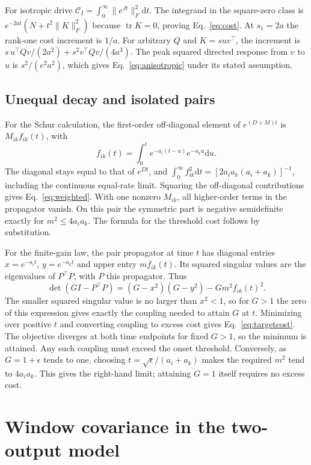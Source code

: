 \documentclass[aps,10pt,onecolumn,superscriptaddress,nofootinbib,longbibliography,
  amsmath,amssymb,floatfix]{revtex4-2}
\newcommand{\Tr}{\operatorname{tr}}
\newcommand{\Cnoise}{\mathcal C}
\newcommand{\dd}{\mathrm{d}}
\begin{document}
For isotropic drive \(\Cnoise_I=\int_0^\infty \|e^{Jt}\|_F^2\dd t\).
The integrand in the square-zero class is
\(e^{-2at}(N+t^2\|K\|_F^2)\) because \(\Tr K=0\), proving
Eq.~\eqref{eq:cost}. At \(s_1=2a\) the rank-one cost increment is
\(1/a\). For arbitrary \(Q\) and \(K=suv^\top\), the increment is
\(s\,u^\top Qv/(2a^2)+s^2 v^\top Qv/(4a^3)\).
The peak squared directed response from \(v\) to \(u\) is
\(s^2/(e^2a^2)\), which gives Eq.~\eqref{eq:anisotropic} under
its stated assumption.

\subsection{Unequal decay and isolated pairs}

For the Schur calculation, the first-order off-diagonal element of
\(e^{(D+M)t}\) is \(M_{ik}f_{ik}(t)\), with
\[
  f_{ik}(t)=\int_0^t e^{-a_i(t-u)}e^{-a_k u}\dd u .
\]
The diagonal stays equal to that of \(e^{Dt}\), and
\(\int_0^\infty f_{ik}^2\dd t=[2a_i a_k(a_i+a_k)]^{-1}\),
including the continuous equal-rate limit. Squaring the
off-diagonal contributions gives Eq.~\eqref{eq:weighted}.
With one nonzero \(M_{ik}\), all higher-order terms in the propagator
vanish. On this pair the symmetric part is negative semidefinite
exactly for \(m^2\le4a_i a_k\). The formula for the threshold cost
follows by substitution.

For the finite-gain law, the pair propagator at time \(t\) has
diagonal entries \(x=e^{-a_i t}\), \(y=e^{-a_k t}\) and upper
entry \(m f_{ik}(t)\). Its squared singular values are the
eigenvalues of \(P^\top P\), with \(P\) this propagator. Thus
\[
 \det(GI-P^\top P)=(G-x^2)(G-y^2)-Gm^2 f_{ik}(t)^2 .
\]
The smaller squared singular value is no larger than \(x^2<1\),
so for \(G>1\) the zero of this expression gives exactly the
coupling needed to attain \(G\) at \(t\). Minimizing over
positive \(t\) and converting coupling to excess cost gives
Eq.~\eqref{eq:targetcost}. The objective diverges at both time
endpoints for fixed \(G>1\), so the minimum is attained.
Any such coupling must exceed the onset threshold. Conversely,
as \(G=1+\epsilon\) tends to one, choosing
\(t=\sqrt{\epsilon}/(a_i+a_k)\) makes the required \(m^2\) tend to
\(4a_i a_k\). This gives the right-hand limit; attaining \(G=1\)
itself requires no excess cost.

\section{Window covariance in the two-output model}
\label{app:window}
\end{document}
